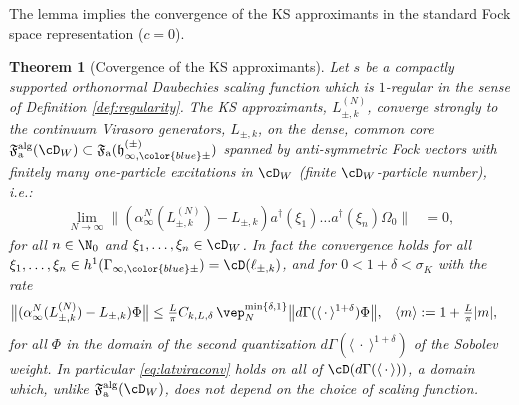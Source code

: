 \documentclass[a4paper, 11pt]{article}
\newcommand{\ua}{\textup a}
\newcommand{\fF}{\mathfrak{F}}\newcommand{\cF}{\mathcal{F}}\newcommand{\dF}{\mathds{F}}\newcommand{\sF}{\mathscr{F}}
\newcommand{\fh}{\mathfrak{h}}
\DeclareMathOperator{\1}{\mathds{1}}
\DeclareMathOperator{\alg}{alg}
\newtheorem{thm}{Theorem} [section]
\begin{document}
The lemma implies the convergence of the KS approximants in the standard Fock space representation ($c=0$).
\begin{thm}[Covergence of the KS approximants]
\label{thm:KSconv}
Let $s$ be a compactly supported orthonormal Daubechies scaling function which is $1$-regular in the sense of Definition \ref{def:regularity}. The KS approximants, $L^{(N)}_{\pm,k}$, converge strongly to the continuum Virasoro generators, $L_{\pm,k}$, on the dense, common core $\fF^{\alg}_{\ua}(\cD_{W})\subset\fF_{\ua}(\fh^{(\pm)}_{\infty,{\color{blue}\pm}})$ spanned by anti-symmetric Fock vectors with finitely many one-particle excitations in $\cD_{W}$ (finite $\cD_{W}$-particle number), i.e.:
\begin{align}
\label{eq:latviraconv}
\lim_{N\rightarrow\infty}\|(\alpha^{N}_{\infty}(L^{(N)}_{\pm,k}) - L_{\pm,k})a^{\dagger}(\xi_{1})\dots a^{\dagger}(\xi_{n})\Omega_{0}\| & = 0,
\end{align}
for all $n\in\N_{0}$ and $\xi_{1},\dots,\xi_{n}\in\cD_{W}$. In fact the convergence holds for all $\xi_{1},\dots,\xi_{n}\in h^{1}(\Gamma_{\infty,{\color{blue}\pm}}) = \cD(\ell_{\pm,k})$, and for $0<1+\delta<\sigma_{K}$ with the rate
\begin{align}
\label{eq:latviraconvrate}
\big\|(\alpha^{N}_{\infty}(L^{(N)}_{\pm,k}) - L_{\pm,k})\Phi\big\| & \leq \tfrac{L}{\pi}C_{k,L,\delta}\!\ \vep_{N}^{\min\{\delta,1\}}\big\|d\Gamma(\langle\!\ \cdot\!\ \rangle^{1+\delta})\Phi\big\|, & \langle m\rangle & := 1+\tfrac{L}{\pi}|m|,
\end{align}
for all $\Phi$ in the domain of the second quantization $d\Gamma(\langle\!\ \cdot\!\ \rangle^{1+\delta})$ of the Sobolev weight. In particular \eqref{eq:latviraconv} holds on all of $\cD(d\Gamma(\langle\!\ \cdot\!\ \rangle))$, a domain which, unlike $\fF^{\alg}_{\ua}(\cD_{W})$, does not depend on the choice of scaling function.
\end{thm}
\end{document}
